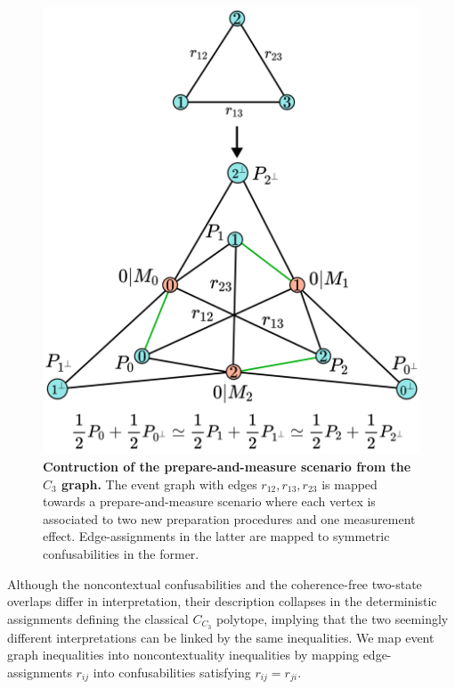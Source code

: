 \documentclass[a4paper,twocolumn,11pt,accepted=2024-01-17]{quantumarticle}
\begin{document}
\begin{figure}[tb]
    \centering
    \includegraphics[width=\columnwidth]{Acc_Figures/FromC3toLSSS.png}
    \caption{\textbf{Contruction of the prepare-and-measure scenario from the $C_3$ graph.} The event graph with edges $r_{12},r_{13},r_{23}$ is mapped towards a prepare-and-measure scenario where each vertex is associated to two new preparation procedures and one measurement effect. Edge-assignments in the latter are mapped to symmetric confusabilities in the former.}
    \label{fig:From Event Graph to Operational Scenarios}
\end{figure}

Although the noncontextual confusabilities and the coherence-free two-state overlaps differ in interpretation, their description collapses in the deterministic assignments defining the classical $C_{C_3}$ polytope, implying that the two seemingly different interpretations can be linked by the same inequalities. We map event graph inequalities into noncontextuality inequalities by mapping edge-assignments $r_{ij}$ into confusabilities satisfying $r_{ij}=r_{ji}$.
\end{document}
